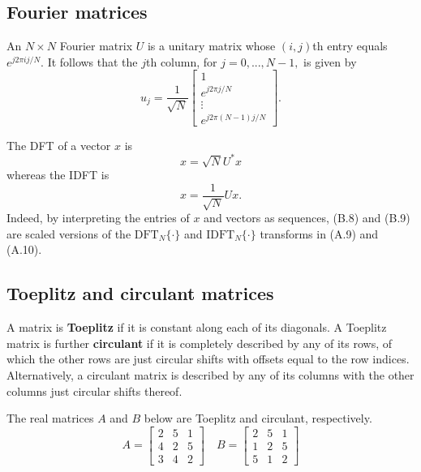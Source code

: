 \documentclass[a4paper, 12pt]{book}
\begin{document}
\subsection{Fourier matrices}
An $N \times N$ Fourier matrix $U$ is a unitary matrix whose $(i, j)$th entry equals $e^{j2\pi ij/N}.$ It follows that the $j$th column, for $j=0,...,N-1,$ is given by
\begin{equation}
    u_{j}=\frac{1}{\sqrt{N}}
    \begin{bmatrix}
    1\\
    e^{j2\pi j/N}\\
    \vdots\\
    e^{j2\pi(N-1)j/N}
    \end{bmatrix}.
    \tag{B.7}
\end{equation}

The DFT of a vector $x$ is
\begin{equation}
    x = \sqrt{N}U^* x \tag{B.8}
\end{equation}
whereas the IDFT is
\begin{equation}
    x = \frac{1}{\sqrt{N}}Ux. \tag{B.9}
\end{equation}
Indeed, by interpreting the entries of $x$ and vectors as sequences, (B.8) and (B.9) are scaled versions of the $\text{DFT}_{N}\{\cdot\}$ and $\text{IDFT}_{N}\{\cdot\}$ transforms in (A.9) and (A.10).

\subsection{Toeplitz and circulant matrices}
A matrix is \textbf{Toeplitz} if it is constant along each of its diagonals. A Toeplitz matrix is further \textbf{circulant} if it is completely described by any of its rows, of which the other rows are just circular shifts with offsets equal to the row indices. Alternatively, a circulant matrix is described by any of its columns with the other columns just circular shifts thereof.

\begin{greenbox}[Example B.4]
The real matrices $A$ and $B$ below are Toeplitz and circulant, respectively.
\begin{equation}
    A = \begin{bmatrix} 2 & 5 & 1 \\ 4 & 2 & 5 \\ 3 & 4 & 2 \end{bmatrix} \quad 
    B = \begin{bmatrix} 2 & 5 & 1 \\ 1 & 2 & 5 \\ 5 & 1 & 2 \end{bmatrix} \tag{B.10}
\end{equation}
\end{greenbox}
\end{document}
